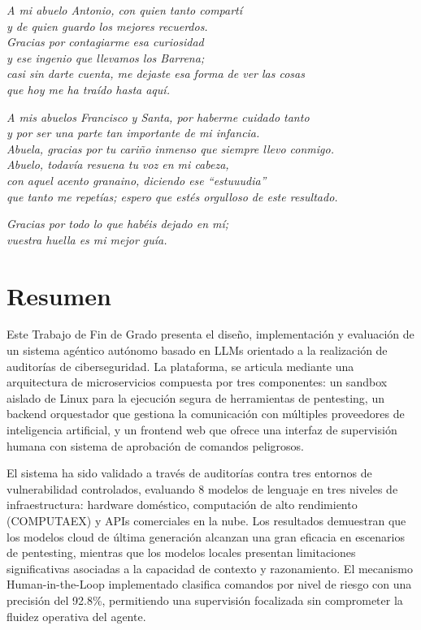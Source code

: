 \documentclass[hidelinks, headlogo, framedcover]{tfeEPCC}
\begin{document}
\begin{flushright}
    \textit{A mi abuelo Antonio, con quien tanto compartí \\ 
    y de quien guardo los mejores recuerdos. \\ 
    Gracias por contagiarme esa curiosidad \\ 
    y ese ingenio que llevamos los Barrena; \\ 
    casi sin darte cuenta, me dejaste esa forma de ver las cosas \\ 
    que hoy me ha traído hasta aquí.}

    \vspace{0.8cm}

    \textit{A mis abuelos Francisco y Santa, por haberme cuidado tanto \\ 
    y por ser una parte tan importante de mi infancia. \\ 
    Abuela, gracias por tu cariño inmenso que siempre llevo conmigo. \\ 
    Abuelo, todavía resuena tu voz en mi cabeza, \\ 
    con aquel acento granaino, diciendo ese “estuuudia” \\ 
    que tanto me repetías; espero que estés orgulloso de este resultado.}

    \vspace{0.8cm}

    \textit{Gracias por todo lo que habéis dejado en mí; \\ 
    vuestra huella es mi mejor guía.}
\end{flushright}

\cleardoublepage
\chapter*{Resumen}
Este Trabajo de Fin de Grado presenta el diseño, implementación y evaluación de un sistema agéntico autónomo basado en LLMs orientado a la realización de auditorías de ciberseguridad. La plataforma, se articula mediante una arquitectura de microservicios compuesta por tres componentes: un sandbox aislado de Linux para la ejecución segura de herramientas de pentesting, un backend orquestador que gestiona la comunicación con múltiples proveedores de inteligencia artificial, y un frontend web que ofrece una interfaz de supervisión humana con sistema de aprobación de comandos peligrosos.

El sistema ha sido validado a través de auditorías contra tres entornos de vulnerabilidad controlados, evaluando 8 modelos de lenguaje en tres niveles de infraestructura: hardware doméstico, computación de alto rendimiento (COMPUTAEX) y APIs comerciales en la nube. Los resultados demuestran que los modelos cloud de última generación alcanzan una gran eficacia en escenarios de pentesting, mientras que los modelos locales presentan limitaciones significativas asociadas a la capacidad de contexto y razonamiento. El mecanismo Human-in-the-Loop implementado clasifica comandos por nivel de riesgo con una precisión del 92.8\%, permitiendo una supervisión focalizada sin comprometer la fluidez operativa del agente.
\end{document}
